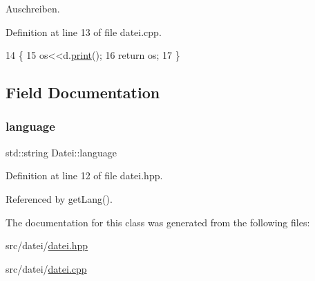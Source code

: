 Auschreiben. 

Definition at line 13 of file datei.\+cpp.


\begin{DoxyCode}
14 \{
15     os<<d.\mbox{\hyperlink{class_datei_a5dedc9776ebe637f0842300f648d4b17}{print}}();
16     \textcolor{keywordflow}{return} os;
17 \}
\end{DoxyCode}


\subsection{Field Documentation}
\mbox{\label{class_datei_a49b90e65e1e9523b2a61e370727d9510}} 
\subsubsection{\texorpdfstring{language}{language}}
{\footnotesize\ttfamily std\+::string Datei\+::language\hspace{0.3cm}{\ttfamily [protected]}}



Definition at line 12 of file datei.\+hpp.



Referenced by get\+Lang().



The documentation for this class was generated from the following files\+:\begin{DoxyCompactItemize}
\item 
src/datei/\mbox{\hyperlink{datei_8hpp}{datei.\+hpp}}\item 
src/datei/\mbox{\hyperlink{src_2datei_2datei_8cpp}{datei.\+cpp}}\end{DoxyCompactItemize}
